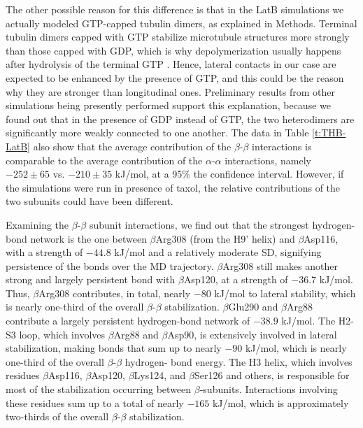 \documentclass[11pt]{report}
\begin{document}
The other possible reason for this difference is that in the LatB simulations we actually modeled GTP-capped tubulin dimers, as explained in Methods.
Terminal tubulin dimers capped with GTP stabilize
microtubule structures more strongly than those capped with GDP, which is why depolymerization usually happens after hydrolysis of the terminal GTP
\cite{Mitchison1984}. 
Hence, lateral contacts in our case are expected to be enhanced by the presence of GTP, and this could be the reason why they are stronger than longitudinal ones. Preliminary results from other simulations being presently performed support this explanation, because we found out that in the presence of GDP instead of GTP, the two heterodimers are significantly more weakly connected to one another. 
The data in Table
\ref{t:THB-LatB} 
also show that the average contribution of the $\beta$-$\beta$ interactions is comparable to the average contribution of the $\alpha$-$\alpha$ interactions, namely $-252\pm65$ vs. $-210\pm35$ kJ/mol, at a 95\% the confidence interval. However, if the simulations were run in presence of taxol, the relative contributions of the two subunits could have been different.

Examining the $\beta$-$\beta$ subunit interactions, we find out that
the strongest hydrogen-bond network is the one between $\beta$Arg308 (from the H9' helix) and $\beta$Asp116, with a strength of $-44.8$ kJ/mol and a relatively moderate SD, signifying persistence of the bonds over the MD trajectory. $\beta$Arg308 still makes another strong and largely persistent bond with $\beta$Asp120, at a strength of $-36.7$ kJ/mol. Thus, $\beta$Arg308 contributes, in total, nearly $-80$ kJ/mol to lateral stability, which is nearly one-third of the overall $\beta$-$\beta$ stabilization. $\beta$Glu290 and $\beta$Arg88 contribute a largely persistent hydrogen-bond network of $-38.9$ kJ/mol. The H2-S3 loop, which involves $\beta$Arg88 and $\beta$Asp90, is extensively involved in lateral stabilization, making bonds that sum up to nearly $-90$ kJ/mol, which is nearly one-third of the overall $\beta$-$\beta$ hydrogen- bond energy. The H3 helix, which involves residues $\beta$Asp116, $\beta$Asp120, $\beta$Lys124, and $\beta$Ser126 and others, is responsible for most of the stabilization occurring between $\beta$-subunits. Interactions involving these residues sum up
to a total of nearly $-165$ kJ/mol, which is approximately two-thirds of the overall $\beta$-$\beta$ stabilization.
\end{document}
